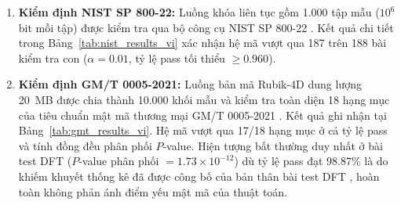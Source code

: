 \documentclass[10pt,twocolumn]{article}
\begin{document}
\begin{enumerate}
    \item \textbf{Kiểm định NIST SP 800-22:} Luồng khóa liên tục gồm 1.000 tập mẫu ($10^6$ bit mỗi tập) được kiểm tra qua bộ công cụ NIST SP 800-22 \cite{rukhin2010nist}. Kết quả chi tiết trong Bảng~\ref{tab:nist_results_vi} xác nhận hệ mã vượt qua 187 trên 188 bài kiểm tra con ($\alpha = 0.01$, tỷ lệ pass tối thiểu $\ge 0.960$).
    \item \textbf{Kiểm định GM/T 0005-2021:} Luồng bản mã Rubik-4D dung lượng 20~MB được chia thành 10.000 khối mẫu và kiểm tra toàn diện 18 hạng mục của tiêu chuẩn mật mã thương mại GM/T 0005-2021 \cite{gmt0005}. Kết quả ghi nhận tại Bảng~\ref{tab:gmt_results_vi}. Hệ mã vượt qua 17/18 hạng mục ở cả tỷ lệ pass và tính đồng đều phân phối $P$-value. Hiện tượng bất thường duy nhất ở bài test DFT ($P$-value phân phối $= 1.73 \times 10^{-12}$) dù tỷ lệ pass đạt $98.87\%$ là do khiếm khuyết thống kê đã được công bố của bản thân bài test DFT \cite{kim2004dft}, hoàn toàn không phản ánh điểm yếu mật mã của thuật toán.
\end{enumerate}
\end{document}

